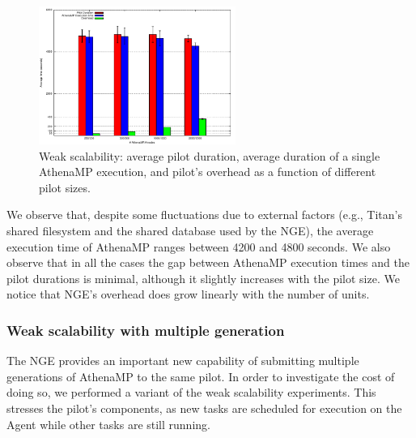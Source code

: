\begin{figure}[!htb]
        \includegraphics[height=4.5cm,width=\columnwidth]{./figures/NGE/weak1.pdf}
    \caption{Weak scalability: average pilot duration, average  duration of a
    single AthenaMP execution, and pilot's overhead as a function of different pilot sizes. }
\label{fig:weakScal1a}
\end{figure}

We %
observe that, despite some fluctuations due to external factors
(e.g., Titan's shared filesystem and the shared database used by the NGE), the
average execution time of AthenaMP %
ranges between 4200 and 4800 seconds. %
We %
also observe that in all the cases the gap between AthenaMP execution times and
the pilot durations is minimal, although it slightly increases with the pilot
size. %
We %
notice that NGE's overhead does grow linearly with the number of units.




\subsubsection{Weak scalability with multiple generation }

The NGE provides an important new capability of submitting multiple
generations of AthenaMP to the same pilot. In order to investigate the cost of
doing so, we performed a variant of the weak scalability experiments. This
stresses the pilot's components, as new tasks are scheduled for execution on
the Agent while other tasks are still running.

